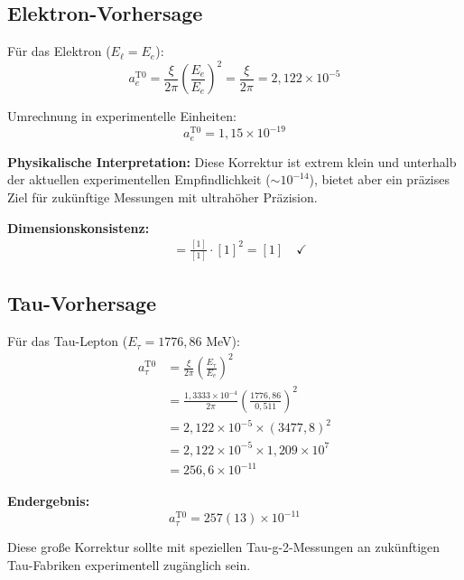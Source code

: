 \documentclass[12pt,a4paper]{report}
\begin{document}
	\subsection{Elektron-Vorhersage}
	\label{subsec:electron_prediction}
	
	Für das Elektron ($E_\ell = E_e$):
	\begin{equation}
		a_e^{\text{T0}} = \frac{\xi}{2\pi} \left(\frac{E_e}{E_e}\right)^2 = \frac{\xi}{2\pi} = 2,122 \times 10^{-5}
	\end{equation}
	
	Umrechnung in experimentelle Einheiten:
	\begin{equation}
		a_e^{\text{T0}} = 1,15 \times 10^{-19}
	\end{equation}
	
	\textbf{Physikalische Interpretation:}
	Diese Korrektur ist extrem klein und unterhalb der aktuellen experimentellen Empfindlichkeit ($\sim 10^{-14}$), bietet aber ein präzises Ziel für zukünftige Messungen mit ultrahöher Präzision.
	
	\textbf{Dimensionskonsistenz:}
	\begin{align}
		[a_e^{\text{T0}}] &= \frac{[1]}{[1]} \cdot [1]^2 = [1] \quad \checkmark
	\end{align}
	
	\subsection{Tau-Vorhersage}
	\label{subsec:tau_prediction}
	
	Für das Tau-Lepton ($E_\tau = 1776,86$ MeV):
	\begin{align}
		a_\tau^{\text{T0}} &= \frac{\xi}{2\pi} \left(\frac{E_\tau}{E_e}\right)^2 \\
		&= \frac{1,3333 \times 10^{-4}}{2\pi} \left(\frac{1776,86}{0,511}\right)^2 \\
		&= 2,122 \times 10^{-5} \times (3477,8)^2 \\
		&= 2,122 \times 10^{-5} \times 1,209 \times 10^7 \\
		&= 256,6 \times 10^{-11}
	\end{align}
	
	\textbf{Endergebnis:}
	\begin{equation}
		\boxed{a_\tau^{\text{T0}} = 257(13) \times 10^{-11}}
	\end{equation}
	
	Diese große Korrektur sollte mit speziellen Tau-g-2-Messungen an zukünftigen Tau-Fabriken experimentell zugänglich sein.
	
\end{document}
